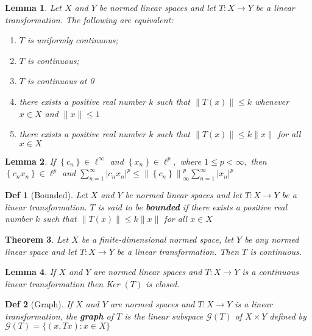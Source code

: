 \documentclass[10pt]{paper}
\newtheorem{theorem}{Theorem}[section]
\newtheorem{definition}{Def}[section]
\newtheorem{lemma}[theorem]{Lemma}
\begin{document}
\begin{lemma}
    Let $X$ and $Y$ be normed linear spaces and let $T: X \rightarrow Y$ be a linear transformation. The following are equivalent:
    \begin{enumerate}
        \item $T$ is uniformly continuous;
        \item $T$ is continuous;
        \item $T$ is continuous at 0
        \item there exists a positive real number $k$ such that $\|T(x)\| \leq k$ whenever $x \in X$ and $\|x\| \leq 1$
        \item there exists a positive real number $k$ such that $\|T(x)\| \leq k\|x\|$ for all $x \in X$
    \end{enumerate}
\end{lemma}

\begin{lemma}
    If $\left\{c_{n}\right\} \in \ell^{\infty}$ and $\left\{x_{n}\right\} \in \ell^{p},$ where $1 \leq p<\infty,$ then $\left\{c_{n} x_{n}\right\} \in \ell^{p}$ and $ \sum_{n=1}^{\infty}\left|c_{n} x_{n}\right|^{p} \leq\left\|\left\{c_{n}\right\}\right\|_{\infty}^{p} \sum_{n=1}^{\infty}\left|x_{n}\right|^{p}$
\end{lemma}

\begin{definition}[Bounded]
    Let $X$ and $Y$ be normed linear spaces and let $T: X \rightarrow Y$ be a linear transformation. $T$ is said to be \textbf{bounded} if there exists a positive real number $k$ such that $\|T(x)\| \leq k\|x\|$ for all $x \in X$
\end{definition}

\begin{theorem}
    Let $X$ be a finite-dimensional normed space, let $Y$ be any normed linear space and let $T: X \rightarrow Y$ be a linear transformation. Then $T$ is continuous.
\end{theorem}

\begin{lemma}
    If $X$ and $Y$ are normed linear spaces and $T: X \rightarrow Y$ is a continuous linear transformation then Ker $(T)$ is closed.
\end{lemma}

\begin{definition}[Graph]
    If $X$ and $Y$ are normed spaces and $T: X \rightarrow Y$ is a linear transformation, the \textbf{graph} of $T$ is the linear subspace $\mathcal{G}(T)$ of $X \times Y$ defined by $\mathcal{G}(T)=\{(x, T x): x \in X\}$
\end{definition}
\end{document}
